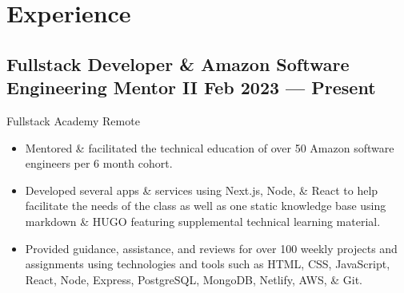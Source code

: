 \documentclass[a4,10pt]{article}
\newcommand{\subtext}[1]{
#1\par\vspace{-0.2cm}}
\newenvironment{zitemize}{
\begin{itemize}\itemsep0pt \parskip0pt \parsep1pt}
{\end{itemize}\vspace{-0.5cm}}
\begin{document}
\section{Experience}

\subsection*{Fullstack Developer \& Amazon Software Engineering Mentor II {\normalsize \normalfont} \hfill  Feb 2023 --- Present }
\subtext{Fullstack Academy \hfill Remote }
    \begin{zitemize}
        \item Mentored \& facilitated the technical education of over 50 Amazon software engineers per 6 month cohort.
        \item Developed several apps \& services using Next.js, Node, \& React to help facilitate the needs of the class as well as one static knowledge base using markdown \& HUGO featuring supplemental technical learning material.
        \item Provided guidance, assistance, and reviews for over 100 weekly projects and assignments using technologies and tools such as HTML, CSS, JavaScript, React, Node, Express, PostgreSQL, MongoDB, Netlify, AWS, \& Git.
    \end{zitemize}
\end{document}
